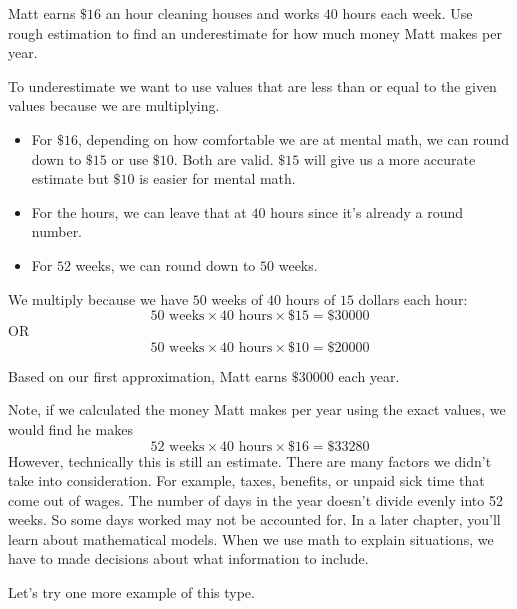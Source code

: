\documentclass{ximera}
\begin{document}
\begin{example}
 Matt earns $\$16$ an hour cleaning houses and works $40$ hours each week. Use rough estimation to find an underestimate for how much money Matt makes per year.

\begin{explanation}
To underestimate we want to use values that are less than or equal to the given values because we are multiplying. 
\begin{itemize}
\item For $\$16$, depending on how comfortable we are at mental math, we can round down to $\$15$ or use $\$10$. Both are valid. $\$15$ will give us a more accurate estimate but $\$10$ is easier for mental math.  
\item For the hours, we can leave that at $40$ hours since it's already a round number.
\item For $52$ weeks, we can round down to $50$ weeks.
\end{itemize}

We multiply because we have $50$ weeks of $40$ hours of $15$ dollars each hour:
$$50 \text{ weeks} \times 40 \text{ hours} \times \$15 =\$30000$$
OR $$50 \text{ weeks} \times 40 \text{ hours} \times \$10 =\$20000$$

Based on our first approximation, Matt earns $\$30000$ each year.
\end{explanation}
\end{example}

\begin{MM}
Note, if we calculated the money Matt makes per year using the exact values, we would find he makes
$$52 \text{ weeks} \times 40 \text{ hours} \times \$16 =\$33280$$ 
However, technically this is still an estimate. There are many factors we didn't take into consideration. For example, taxes, benefits, or unpaid sick time that come out of wages.  The number of days in the year doesn't divide evenly into 52 weeks. So some days worked may not be accounted for.  In a later chapter, you'll learn about mathematical models. When we use math to explain situations, we have to made decisions about what information to include.
\end{MM}

Let's try one more example of this type.
\end{document}
